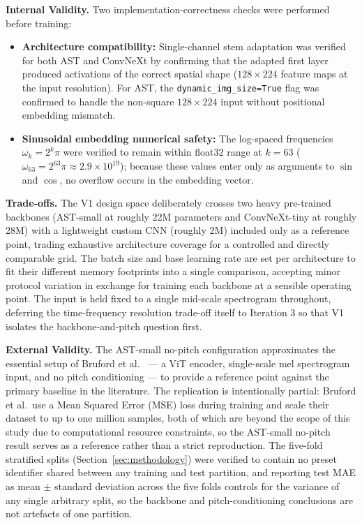 \par \vspace{0.3cm}
\noindent\textbf{Internal Validity.} Two implementation-correctness checks were performed before training:
\begin{itemize}
    \item \textbf{Architecture compatibility:} Single-channel stem adaptation was verified for both AST and ConvNeXt by confirming that the adapted first layer produced activations of the correct spatial shape ($128 \times 224$ feature maps at the input resolution). For AST, the \texttt{dynamic\_img\_size=True} flag was confirmed to handle the non-square $128 \times 224$ input without positional embedding mismatch.

    \item \textbf{Sinusoidal embedding numerical safety:} The log-spaced frequencies $\omega_k = 2^k \pi$ were verified to remain within float32 range at $k = 63$ ($\omega_{63} = 2^{63}\pi \approx 2.9 \times 10^{19}$); because these values enter only as arguments to $\sin$ and $\cos$, no overflow occurs in the embedding vector.
\end{itemize}

\par \vspace{0.3cm}
\noindent\textbf{Trade-offs.} The V1 design space deliberately crosses two heavy pre-trained backbones (AST-small at roughly 22M parameters and ConvNeXt-tiny at roughly 28M) with a lightweight custom CNN (roughly 2M) included only as a reference point, trading exhaustive architecture coverage for a controlled and directly comparable grid. The batch size and base learning rate are set per architecture to fit their different memory footprints into a single comparison, accepting minor protocol variation in exchange for training each backbone at a sensible operating point. The input is held fixed to a single mid-scale spectrogram throughout, deferring the time-frequency resolution trade-off itself to Iteration 3 so that V1 isolates the backbone-and-pitch question first.

\par \vspace{0.3cm}
\noindent\textbf{External Validity.} The AST-small no-pitch configuration approximates the essential setup of Bruford et al.\ \cite{bruford2024ast} — a ViT encoder, single-scale mel spectrogram input, and no pitch conditioning — to provide a reference point against the primary baseline in the literature. The replication is intentionally partial: Bruford et al.\ use a Mean Squared Error (MSE) loss during training and scale their dataset to up to one million samples, both of which are beyond the scope of this study due to computational resource constraints, so the AST-small no-pitch result serves as a reference rather than a strict reproduction. The five-fold stratified splits (Section~\ref{sec:methodology}) were verified to contain no preset identifier shared between any training and test partition, and reporting test MAE as mean $\pm$ standard deviation across the five folds controls for the variance of any single arbitrary split, so the backbone and pitch-conditioning conclusions are not artefacts of one partition.

